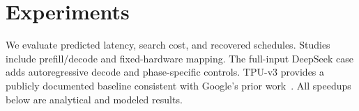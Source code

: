 \section{Experiments}
\label{sec:experiments}
We evaluate predicted latency, search cost, and recovered schedules.
Studies include prefill/decode and fixed-hardware mapping.
The full-input DeepSeek case adds autoregressive decode and phase-specific controls.
TPU-v3 provides a publicly documented baseline consistent with Google's prior work~\citep{jouppi2021ten,zhang_fast}.
All speedups below are analytical and modeled results.



